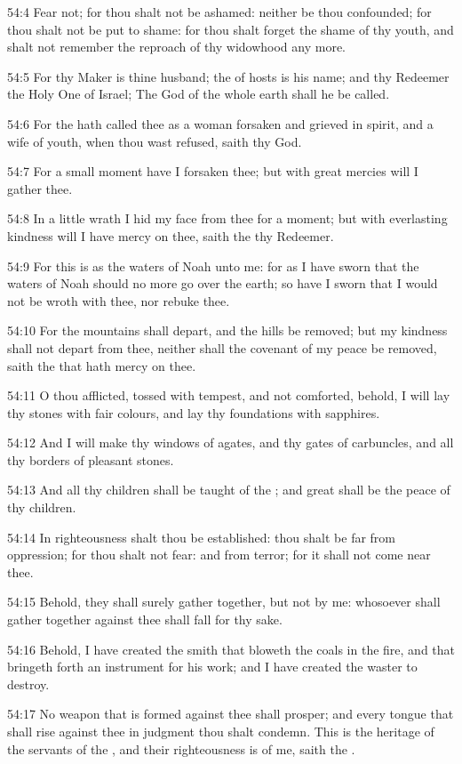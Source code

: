 54:4 Fear not; for thou shalt not be ashamed: neither be thou confounded; for thou shalt not be put to shame: for thou shalt forget the shame of thy youth, and shalt not remember the reproach of thy widowhood any more.

54:5 For thy Maker is thine husband; the \LORD of hosts is his name; and thy Redeemer the Holy One of Israel; The God of the whole earth shall he be called.

54:6 For the \LORD hath called thee as a woman forsaken and grieved in spirit, and a wife of youth, when thou wast refused, saith thy God.

54:7 For a small moment have I forsaken thee; but with great mercies will I gather thee.

54:8 In a little wrath I hid my face from thee for a moment; but with everlasting kindness will I have mercy on thee, saith the \LORD thy Redeemer.

54:9 For this is as the waters of Noah unto me: for as I have sworn that the waters of Noah should no more go over the earth; so have I sworn that I would not be wroth with thee, nor rebuke thee.

54:10 For the mountains shall depart, and the hills be removed; but my kindness shall not depart from thee, neither shall the covenant of my peace be removed, saith the \LORD that hath mercy on thee.

54:11 O thou afflicted, tossed with tempest, and not comforted, behold, I will lay thy stones with fair colours, and lay thy foundations with sapphires.

54:12 And I will make thy windows of agates, and thy gates of carbuncles, and all thy borders of pleasant stones.

54:13 And all thy children shall be taught of the \LORD; and great shall be the peace of thy children.

54:14 In righteousness shalt thou be established: thou shalt be far from oppression; for thou shalt not fear: and from terror; for it shall not come near thee.

54:15 Behold, they shall surely gather together, but not by me: whosoever shall gather together against thee shall fall for thy sake.

54:16 Behold, I have created the smith that bloweth the coals in the fire, and that bringeth forth an instrument for his work; and I have created the waster to destroy.

54:17 No weapon that is formed against thee shall prosper; and every tongue that shall rise against thee in judgment thou shalt condemn.  This is the heritage of the servants of the \LORD, and their righteousness is of me, saith the \LORD.

